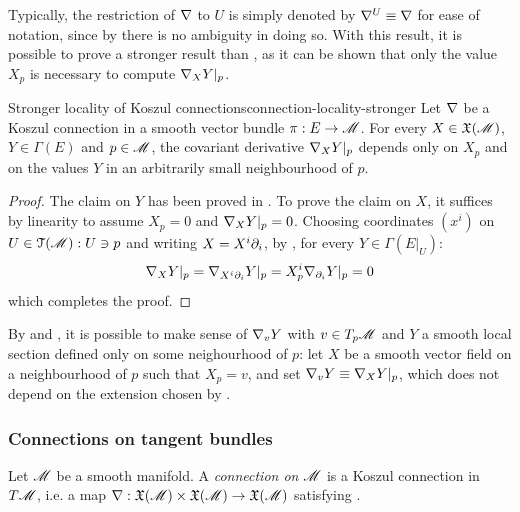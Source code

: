 Typically, the restriction of $ \nabla $ to $ U $ is simply denoted by $ \nabla^U \equiv \nabla $ for ease of notation, since by  there is no ambiguity in doing so. With this result, it is possible to prove a stronger result than , as it can be shown that only the value $ X_p $ is necessary to compute $ \nabla_X Y \vert_p $.

\begin{proposition}{Stronger locality of Koszul connections}{connection-locality-stronger}
  Let $ \nabla $ be a Koszul connection in a smooth vector bundle $ \pi : E \rightarrow \mathscr{M} $. For every $ X \in \mathfrak{X}(\mathscr{M}) $, $ Y \in \Gamma(E) $ and $ p \in \mathscr{M} $, the covariant derivative $ \nabla_X Y \vert_p $ depends only on $ X_p $ and on the values $ Y $ in an arbitrarily small neighbourhood of $ p $.
\end{proposition}

\begin{proofbox}
  \begin{proof}
    The claim on $ Y $ has been proved in . To prove the claim on $ X $, it suffices by linearity to assume $ X_p = 0 $ and $ \nabla_X Y \vert_p = 0 $. Choosing coordinates $ (x^i) $ on $ U \in \EuScript{T}(\mathscr{M}) : U \ni p $ and writing $ X = X^i \partial_i $, by , for every $ Y \in \Gamma(E \vert_U) $:
    \begin{equation*}
      \nabla_X Y \vert_p = \nabla_{X^i \partial_i} Y \vert_p = X^i_p \nabla_{\partial_i} Y \vert_p = 0
    \end{equation*}
    which completes the proof.
  \end{proof}
\end{proofbox}

By  and , it is possible to make sense of $ \nabla_v Y $ with $ v \in T_p\mathscr{M} $ and $ Y $ a smooth local section defined only on some neighourhood of $ p $: let $ X $ be a smooth vector field on a neighbourhood of $ p $ such that $ X_p = v $, and set $ \nabla_v Y \equiv \nabla_X Y \vert_p $, which does not depend on the extension chosen by .

\subsubsection{Connections on tangent bundles}

Let $ \mathscr{M} $ be a smooth manifold. A \emph{connection on $ \mathscr{M} $} is a Koszul connection in $ T\mathscr{M} $, i.e. a map $ \nabla : \mathfrak{X}(\mathscr{M}) \times \mathfrak{X}(\mathscr{M}) \rightarrow \mathfrak{X}(\mathscr{M}) $ satisfying .


